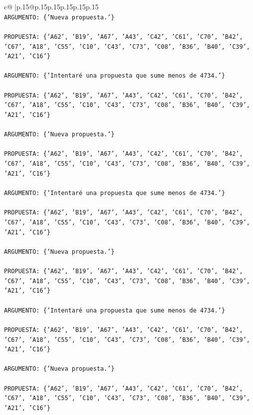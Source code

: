 \documentclass{article}
\begin{document}
{\begin{supertabular}{c@{$\;$}|p{.15\linewidth}@{}p{.15\linewidth}p{.15\linewidth}p{.15\linewidth}p{.15\linewidth}p{.15\linewidth}}
{{{\\ 
\texttt{ARGUMENTO: \{'Nueva propuesta.'\}} \\
\\ 
\texttt{PROPUESTA: \{'A62', 'B19', 'A67', 'A43', 'C42', 'C61', 'C70', 'B42', 'C67', 'A18', 'C55', 'C10', 'C43', 'C73', 'C08', 'B36', 'B40', 'C39', 'A21', 'C16'\}} \\
\\ 
\texttt{ARGUMENTO: \{'Intentaré una propuesta que sume menos de 4734.'\}} \\
\\ 
\texttt{PROPUESTA: \{'A62', 'B19', 'A67', 'A43', 'C42', 'C61', 'C70', 'B42', 'C67', 'A18', 'C55', 'C10', 'C43', 'C73', 'C08', 'B36', 'B40', 'C39', 'A21', 'C16'\}} \\
\\ 
\texttt{ARGUMENTO: \{'Nueva propuesta.'\}} \\
\\ 
\texttt{PROPUESTA: \{'A62', 'B19', 'A67', 'A43', 'C42', 'C61', 'C70', 'B42', 'C67', 'A18', 'C55', 'C10', 'C43', 'C73', 'C08', 'B36', 'B40', 'C39', 'A21', 'C16'\}} \\
\\ 
\texttt{ARGUMENTO: \{'Intentaré una propuesta que sume menos de 4734.'\}} \\
\\ 
\texttt{PROPUESTA: \{'A62', 'B19', 'A67', 'A43', 'C42', 'C61', 'C70', 'B42', 'C67', 'A18', 'C55', 'C10', 'C43', 'C73', 'C08', 'B36', 'B40', 'C39', 'A21', 'C16'\}} \\
\\ 
\texttt{ARGUMENTO: \{'Nueva propuesta.'\}} \\
\\ 
\texttt{PROPUESTA: \{'A62', 'B19', 'A67', 'A43', 'C42', 'C61', 'C70', 'B42', 'C67', 'A18', 'C55', 'C10', 'C43', 'C73', 'C08', 'B36', 'B40', 'C39', 'A21', 'C16'\}} \\
\\ 
\texttt{ARGUMENTO: \{'Intentaré una propuesta que sume menos de 4734.'\}} \\
\\ 
\texttt{PROPUESTA: \{'A62', 'B19', 'A67', 'A43', 'C42', 'C61', 'C70', 'B42', 'C67', 'A18', 'C55', 'C10', 'C43', 'C73', 'C08', 'B36', 'B40', 'C39', 'A21', 'C16'\}} \\
\\ 
\texttt{ARGUMENTO: \{'Nueva propuesta.'\}} \\
\\ 
\texttt{PROPUESTA: \{'A62', 'B19', 'A67', 'A43', 'C42', 'C61', 'C70', 'B42', 'C67', 'A18', 'C55', 'C10', 'C43', 'C73', 'C08', 'B36', 'B40', 'C39', 'A21', 'C16'\}} \\
}}}
\end{supertabular}}
\end{document}
